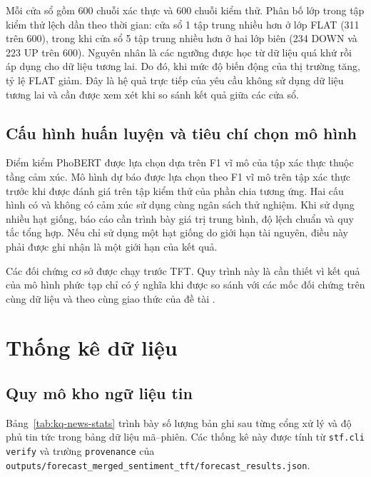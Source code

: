 \documentclass[12pt, a4paper, oneside]{report}
\begin{document}
Mỗi cửa sổ gồm 600 chuỗi xác thực và 600 chuỗi kiểm thử. Phân bố lớp trong tập kiểm thử lệch dần theo thời gian: cửa sổ 1 tập trung nhiều hơn ở lớp FLAT (311 trên 600), trong khi cửa sổ 5 tập trung nhiều hơn ở hai lớp biên (234 DOWN và 223 UP trên 600). Nguyên nhân là các ngưỡng được học từ dữ liệu quá khứ rồi áp dụng cho dữ liệu tương lai. Do đó, khi mức độ biến động của thị trường tăng, tỷ lệ FLAT giảm. Đây là hệ quả trực tiếp của yêu cầu không sử dụng dữ liệu tương lai và cần được xem xét khi so sánh kết quả giữa các cửa sổ.

\subsection{Cấu hình huấn luyện và tiêu chí chọn mô hình}

Điểm kiểm PhoBERT được lựa chọn dựa trên F1 vĩ mô của tập xác thực thuộc tầng cảm xúc. Mô hình dự báo được lựa chọn theo F1 vĩ mô trên tập xác thực trước khi được đánh giá trên tập kiểm thử của phần chia tương ứng. Hai cấu hình có và không có cảm xúc sử dụng cùng ngân sách thử nghiệm. Khi sử dụng nhiều hạt giống, báo cáo cần trình bày giá trị trung bình, độ lệch chuẩn và quy tắc tổng hợp. Nếu chỉ sử dụng một hạt giống do giới hạn tài nguyên, điều này phải được ghi nhận là một giới hạn của kết quả.

Các đối chứng cơ sở được chạy trước TFT. Quy trình này là cần thiết vì kết quả của mô hình phức tạp chỉ có ý nghĩa khi được so sánh với các mốc đối chứng trên cùng dữ liệu và theo cùng giao thức của đề tài
\cite{Feng2018_181009936v2,Chen2021_210708721v1}.
\section{Thống kê dữ liệu}
\label{sec:kq-data}

\subsection{Quy mô kho ngữ liệu tin}

Bảng~\ref{tab:kq-news-stats} trình bày số lượng bản ghi sau từng cổng xử lý và độ phủ tin tức trong bảng
dữ liệu mã--phiên. Các thống kê này được tính từ \texttt{stf.cli verify} và trường
\texttt{provenance} của \texttt{outputs/forecast\_merged\_sentiment\_tft/forecast\_results.json}.
\end{document}
